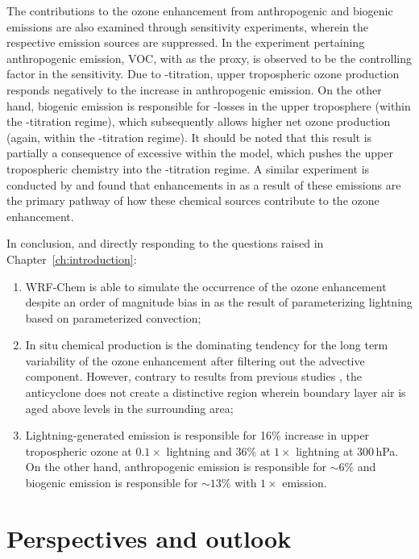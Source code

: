 The contributions to the ozone enhancement from anthropogenic and biogenic emissions are also examined
through sensitivity experiments, wherein the respective emission sources are suppressed. In the
experiment pertaining anthropogenic emission, VOC, with  as the proxy, is observed
to be the controlling factor in the sensitivity. Due to -titration, upper tropospheric
ozone production responds negatively to the increase in anthropogenic emission. On the other hand, biogenic
emission is responsible for -losses in the upper troposphere (within the
-titration regime), which subsequently allows higher net ozone production (again,
within the -titration regime). It should be noted that this result is partially a consequence
of excessive {\lnox} within the model, which pushes the upper tropospheric chemistry into the -titration
regime. A similar experiment is conducted by \citet{Li:2005ss} and found that enhancements in  as a result of
these emissions are the primary pathway of how these chemical sources contribute to the ozone enhancement.

In conclusion, and directly responding to the questions raised in Chapter~\ref{ch:introduction}:
\begin{enumerate}
	\item WRF-Chem is able to simulate the occurrence of the ozone enhancement despite an
	order of magnitude bias in  as the result of parameterizing lightning based on
	parameterized convection;
	\item In situ chemical production is the dominating tendency for the long term variability of
	the ozone enhancement after filtering out the advective component. However, contrary to
	results from previous studies \citep[e.g.][]{Li:2005ss,Cooper:2007cr,Barth:2012qf}, the
	anticyclone does not create a distinctive region wherein boundary layer air is aged above
	levels in the surrounding area;
	\item Lightning-generated  emission is responsible for 16\% increase in upper
	tropospheric ozone at $0.1\times$ lightning and 36\% at $1\times$ lightning at 300\,\unit{hPa}.
	On the other hand, anthropogenic emission is responsible for $\sim6\%$ and biogenic
	emission is responsible for $\sim13\%$ with $1\times$ {\lnox} emission.
\end{enumerate}

\section{Perspectives and outlook}

